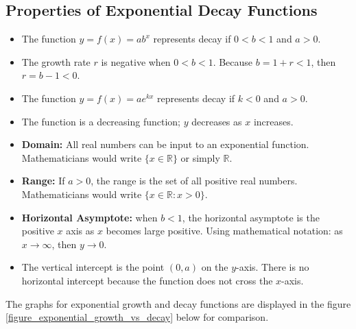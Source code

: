 \subsection{Properties of Exponential Decay Functions}
\begin{itemize}
    \item The function $y=f(x) = ab^x$ represents decay if $0 < b < 1$ and $a > 0$.
    \item The growth rate $r$ is negative when $0 < b < 1$. Because $b = 1 + r < 1$, then $r = b - 1 < 0$.
    \item The function $y=f(x) = ae^{kx}$ represents decay if $k < 0$ and $a > 0$.
    \item The function is a decreasing function; $y$ decreases as $x$ increases.
    \item \textbf{Domain:} All real numbers can be input to an exponential function. Mathematicians would write $\{x \in \mathbb{R}\}$ or simply $\mathbb{R}$.
    \item \textbf{Range:} If $a>0$, the range is the set of all positive real numbers. Mathematicians would write $\{x \in \mathbb{R}: x>0\}$.
    \item \textbf{Horizontal Asymptote:} when $b < 1$, the horizontal asymptote is the positive $x$ axis as $x$ becomes large positive. Using mathematical notation: as $x \to \infty$, then $y \to 0$.
    \item The vertical intercept is the point $(0,a)$ on the $y$-axis. There is no horizontal intercept because the function does not cross the $x$-axis.
\end{itemize}

The graphs for exponential growth and decay functions are displayed in the figure \ref{figure_exponential_growth_vs_decay} below for comparison.


